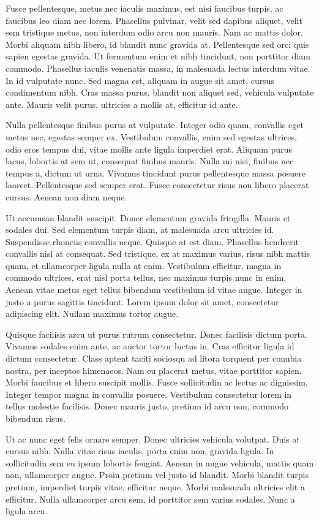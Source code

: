 \documentclass[11pt,]{article}
\begin{document}
Fusce pellentesque, metus nec iaculis maximus, est nisi faucibus turpis,
ac faucibus leo diam nec lorem. Phasellus pulvinar, velit sed dapibus
aliquet, velit sem tristique metus, non interdum odio arcu non mauris.
Nam ac mattis dolor. Morbi aliquam nibh libero, id blandit nunc gravida
at. Pellentesque sed orci quis sapien egestas gravida. Ut fermentum enim
et nibh tincidunt, non porttitor diam commodo. Phasellus iaculis
venenatis massa, in malesuada lectus interdum vitae. In id vulputate
nunc. Sed magna est, aliquam in augue sit amet, cursus condimentum nibh.
Cras massa purus, blandit non aliquet sed, vehicula vulputate ante.
Mauris velit purus, ultricies a mollis at, efficitur id ante.

Nulla pellentesque finibus purus at vulputate. Integer odio quam,
convallis eget metus nec, egestas semper ex. Vestibulum convallis, enim
sed egestas ultrices, odio eros tempus dui, vitae mollis ante ligula
imperdiet erat. Aliquam purus lacus, lobortis at sem ut, consequat
finibus mauris. Nulla mi nisi, finibus nec tempus a, dictum ut urna.
Vivamus tincidunt purus pellentesque massa posuere laoreet. Pellentesque
sed semper erat. Fusce consectetur risus non libero placerat cursus.
Aenean non diam neque.

Ut accumsan blandit suscipit. Donec elementum gravida fringilla. Mauris
et sodales dui. Sed elementum turpis diam, at malesuada arcu ultricies
id. Suspendisse rhoncus convallis neque. Quisque at est diam. Phasellus
hendrerit convallis nisl at consequat. Sed tristique, ex at maximus
varius, risus nibh mattis quam, et ullamcorper ligula nulla at enim.
Vestibulum efficitur, magna in commodo ultrices, erat nisl porta tellus,
nec maximus turpis nunc in enim. Aenean vitae metus eget tellus bibendum
vestibulum id vitae augue. Integer in justo a purus sagittis tincidunt.
Lorem ipsum dolor sit amet, consectetur adipiscing elit. Nullam maximus
tortor augue.

Quisque facilisis arcu ut purus rutrum consectetur. Donec facilisis
dictum porta. Vivamus sodales enim ante, ac auctor tortor luctus in.
Cras efficitur ligula id dictum consectetur. Class aptent taciti
sociosqu ad litora torquent per conubia nostra, per inceptos himenaeos.
Nam eu placerat metus, vitae porttitor sapien. Morbi faucibus et libero
suscipit mollis. Fusce sollicitudin ac lectus ac dignissim. Integer
tempor magna in convallis posuere. Vestibulum consectetur lorem in
tellus molestie facilisis. Donec mauris justo, pretium id arcu non,
commodo bibendum risus.

Ut ac nunc eget felis ornare semper. Donec ultricies vehicula volutpat.
Duis at cursus nibh. Nulla vitae risus iaculis, porta enim non, gravida
ligula. In sollicitudin sem eu ipsum lobortis feugiat. Aenean in augue
vehicula, mattis quam non, ullamcorper augue. Proin pretium vel justo id
blandit. Morbi blandit turpis pretium, imperdiet turpis vitae, efficitur
neque. Morbi malesuada ultricies elit a efficitur. Nulla ullamcorper
arcu sem, id porttitor sem varius sodales. Nunc a ligula arcu.
\end{document}
